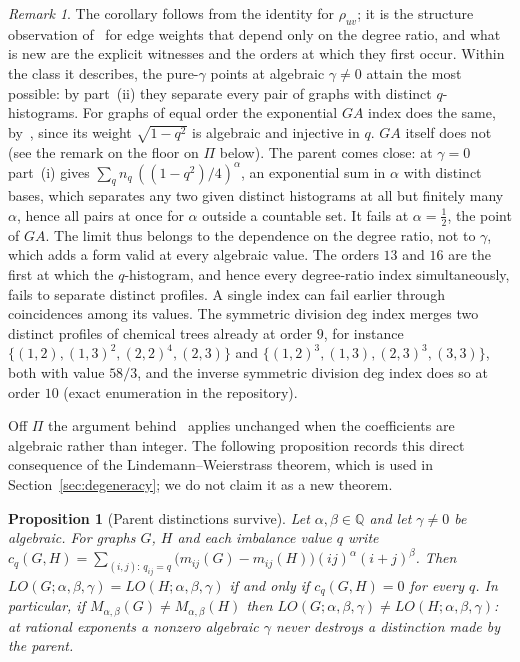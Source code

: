 \documentclass[a5paper, 10pt]{article}
\theoremstyle{plain}
\newtheorem{proposition}[theorem]{Proposition}
\theoremstyle{remark}
\newtheorem*{remark}{Remark}
\theoremstyle{definition}
\begin{document}
  \begin{remark}\label{rem:ratioclass}
  The corollary follows from the identity for $\rho_{uv}$; it is the structure observation of~\cite[Proposition~2.5]{Rada2019ExpVDB} for edge weights that depend only on the degree ratio, and what is new are the explicit witnesses and the orders at which they first occur. Within the
  class it describes, the pure-$\gamma$ points at algebraic
  $\gamma \neq 0$ attain the most possible: by part~(ii) they separate
  every pair of graphs with distinct $q$-histograms. For graphs of equal order the exponential $GA$ index does the same, by~\cite[Corollary~3.5]{Rada2019ExpVDB}, since its weight $\sqrt{1-q^2}$ is algebraic and injective in $q$. $GA$ itself does not
  (see the remark on the floor on $\Pi$ below). The parent comes close:
  at $\gamma = 0$ part~(i) gives $\sum_q n_q\,((1-q^2)/4)^{\alpha}$, an
  exponential sum in $\alpha$ with distinct bases, which separates any
  two given distinct histograms at all but finitely many $\alpha$, hence
  all pairs at once for $\alpha$ outside a countable set. It fails at
  $\alpha = \tfrac12$, the point of $GA$. The limit thus belongs to the
  dependence on the degree ratio, not to $\gamma$, which adds a form
  valid at every algebraic value. The orders $13$ and $16$ are the first at which the $q$-histogram, and
  hence every degree-ratio index simultaneously, fails to separate
  distinct profiles. A single index can fail earlier through coincidences
  among its values. The symmetric division deg index merges two distinct
  profiles of chemical trees already at order $9$, for instance
  $\{(1,2), (1,3)^{2}, (2,2)^{4}, (2,3)\}$ and
  $\{(1,2)^{3}, (1,3), (2,3)^{3}, (3,3)\}$, both with value $58/3$, and the
  inverse symmetric division deg index does so at order $10$ (exact
  enumeration in the repository).
  \end{remark}

  Off $\Pi$ the argument behind~\cite[Theorem~3.4]{Rada2019ExpVDB}
  applies unchanged when the coefficients are algebraic rather than
  integer. The following proposition records this direct consequence of
  the Lindemann--Weierstrass theorem, which is used in
  Section~\ref{sec:degeneracy}; we do not claim it as a new theorem.

  \begin{proposition}[Parent distinctions survive]\label{prop:offplane}
  Let $\alpha, \beta \in \mathbb{Q}$ and let $\gamma \ne 0$ be algebraic.
  For graphs $G$, $H$ and each imbalance value $q$ write
  $c_q(G,H) = \sum_{(i,j):\, q_{ij} = q} \bigl(m_{ij}(G) - m_{ij}(H)\bigr)
  (ij)^{\alpha} (i+j)^{\beta}$. Then
  $LO(G;\alpha,\beta,\gamma) = LO(H;\alpha,\beta,\gamma)$ if and only if
  $c_q(G,H) = 0$ for every $q$. In particular, if
  $M_{\alpha,\beta}(G) \ne M_{\alpha,\beta}(H)$ then
  $LO(G;\alpha,\beta,\gamma) \ne LO(H;\alpha,\beta,\gamma)$: at rational
  exponents a nonzero algebraic $\gamma$ never destroys a distinction
  made by the parent.
  \end{proposition}
\end{document}

